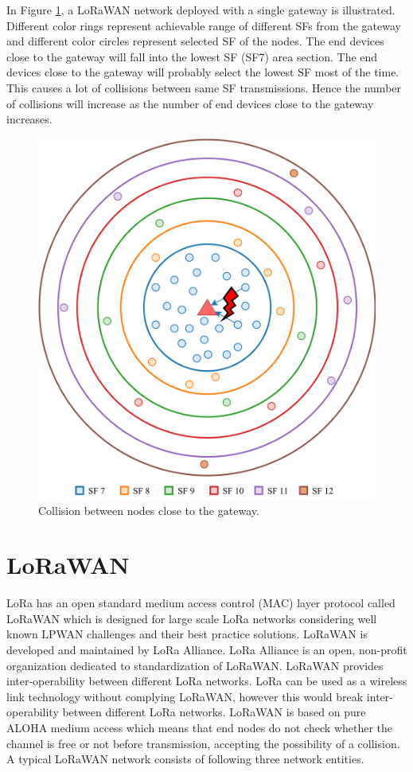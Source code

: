 \documentclass[conference]{IEEEtran}
\begin{document}
In Figure \ref{fig:collision}, a LoRaWAN network deployed with a single gateway is illustrated. Different color rings represent achievable range of different SFs from the gateway and different color circles represent selected SF of the nodes. The end devices close to the gateway will fall into the lowest SF (SF7) area section. The end devices close to the gateway will probably select the lowest SF most of the time. This causes a lot of collisions between same SF transmissions. Hence the number of collisions will increase as the number of end devices close to the gateway increases.

\begin{figure}
\centering
\includegraphics[width=0.83\linewidth]{collision.png}
\caption{Collision between nodes close to the gateway.}
\label{fig:collision}
\end{figure}


\section{LoRaWAN} \label{LoRaWAN}
LoRa has an open standard medium access control (MAC) layer protocol called LoRaWAN which is designed for large scale LoRa networks considering well known LPWAN challenges and their best practice solutions. LoRaWAN is developed and maintained by LoRa Alliance. LoRa Alliance is an open, non-profit organization dedicated to standardization of LoRaWAN. LoRaWAN provides inter-operability between different LoRa networks. LoRa can be used as a wireless link technology without complying LoRaWAN, however this would break inter-operability between different LoRa networks. LoRaWAN is based on pure ALOHA medium access which means that end nodes do not check whether the channel is free or not before transmission, accepting the possibility of a collision. A typical LoRaWAN network consists of following three network entities.
\end{document}
